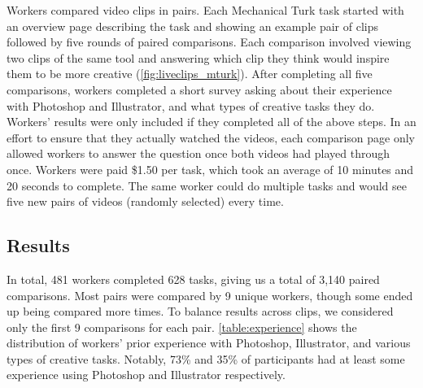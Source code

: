 Workers compared video clips in pairs. Each Mechanical Turk task started with an overview page describing the task and showing an example pair of clips followed by five rounds of paired comparisons. Each comparison involved viewing two clips of the same tool and answering which clip they think would inspire them to be more creative (\autoref{fig:liveclips_mturk}). After completing all five comparisons, workers completed a short survey asking about their experience with Photoshop and Illustrator, and what types of creative tasks they do. Workers' results were only included if they completed all of the above steps. In an effort to ensure that they actually watched the videos, each comparison page only allowed workers to answer the question once both videos had played through once. Workers were paid \$1.50 per task, which took an average of 10 minutes and 20 seconds to complete. The same worker could do multiple tasks and would see five new pairs of videos (randomly selected) every time.

\subsection{Results}
In total, 481 workers completed 628 tasks, giving us a total of 3,140 paired comparisons. Most pairs were compared by 9 unique workers, though some ended up being compared more times. To balance results across clips, we considered only the first 9 comparisons for each pair. \autoref{table:experience} shows the distribution of workers' prior experience with Photoshop, Illustrator, and various types of creative tasks. Notably, 73\% and 35\% of participants had at least some experience using Photoshop and Illustrator respectively.

